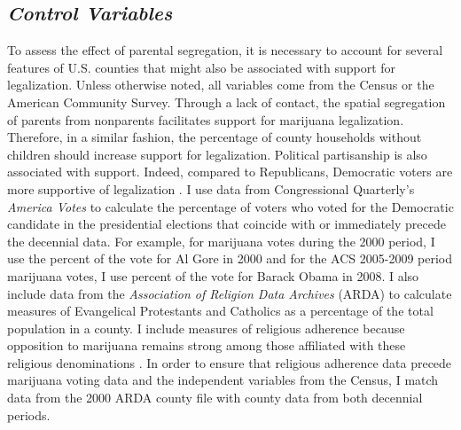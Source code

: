\subsection{\it{Control Variables}}

To assess the effect of parental segregation, it is necessary to account for several features of U.S. counties that might also be associated with support for legalization. Unless otherwise noted, all variables come from the Census or the American Community Survey. Through a lack of contact, the spatial segregation of parents from nonparents facilitates support for marijuana legalization. Therefore, in a similar fashion, the percentage of county households without children should increase support for legalization. Political partisanship is also associated with support. Indeed, compared to Republicans, Democratic voters are more supportive of legalization \citep{rosenthal_and_kubby_1996,caulkins_et_al_2012}. I use data from Congressional Quarterly's {\it{America Votes}} to calculate the percentage of voters who voted for the Democratic candidate in the presidential elections that coincide with or immediately precede the decennial data. For example, for marijuana votes during the 2000 period, I use the percent of the vote for Al Gore in 2000 and for the ACS 2005-2009 period marijuana votes, I use percent of the vote for Barack Obama in 2008. 
I also include data from the {\it{Association of Religion Data Archives}} (ARDA) to calculate measures of Evangelical Protestants and Catholics as a percentage of the total population in a county. I include measures of religious adherence because opposition to marijuana remains strong among those affiliated with these religious denominations \citep{caulkins_et_al_2012,palamar_2014}. In order to ensure that religious adherence data precede marijuana voting data and the independent variables from the Census, I match data from the 2000 ARDA county file with county data from both decennial periods. 

